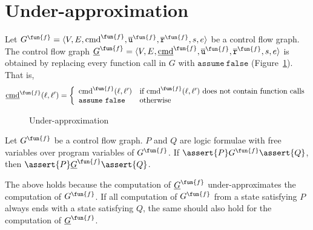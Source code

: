 

\section{Under-approximation}\label{sec:under-approximation}

Let $G^\fun{f} = \langle V, E, \textmd{cmd}^\fun{f}, \overline{\texttt{u}}^\fun{f}, \overline{\texttt{r}}^\fun{f},s,e \rangle$ be a control flow
graph. The control flow graph $\underline{G}^\fun{f} = \langle V, E,
\underline{\textmd{cmd}}^\fun{f}, \overline{\texttt{u}}^\fun{f}, \overline{\texttt{r}}^\fun{f},s,e \rangle$ is obtained by replacing every
function call in $G$ with $\mathtt{assume\ false}$
(Figure~\ref{figure:under-approximation}). That is,
\begin{equation*}
  \underline{\textmd{cmd}}^\fun{f} (\ell, \ell') =
  \left\{
    \begin{array}{ll}
      \textmd{cmd}^\fun{f} (\ell, \ell') & 
      \textmd{if } \textmd{cmd}^\fun{f} (\ell, \ell') 
      \textmd{ does not contain function calls}\\
      \mathtt{assume\ false} &
      \textmd{otherwise}
    \end{array}
  \right.
\end{equation*}

\begin{figure}[t]
  \centering

  \caption{Under-approximation}
  \label{figure:under-approximation}
\end{figure}

\begin{proposition}
  Let $G^\fun{f}$ be a control flow graph. $P$ and $Q$ are logic formulae with
  free variables over program variables of $G^\fun{f}$. If $\assert{P}
  G^\fun{f} \assert{Q}$, then 
  $\assert{P} \underline{G}^\fun{f} \assert{Q}$.
\end{proposition}
The above holds because the computation of $\underline{G}^\fun{f}$ under-approximates the computation of $G^\fun{f}$. If all computation of $G^\fun{f}$ from a state satisfying $P$ always ends with a state satisfying $Q$, the same should also hold for the computation of $\underline{G}^\fun{f}$.
